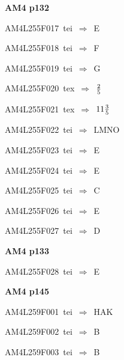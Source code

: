 \par\vfill\eject
{\bf\hfill AM4 p132\hfill\hbox{}}\par\bigskip
{\sixrm AM4L255F017\ {\sixit tei}\ }$\Rightarrow$\ E\par\smallskip
{\sixrm AM4L255F018\ {\sixit tei}\ }$\Rightarrow$\ F\par\smallskip
{\sixrm AM4L255F019\ {\sixit tei}\ }$\Rightarrow$\ G\par\smallskip
{\sixrm AM4L255F020\ {\sixit tex}\ }$\Rightarrow$\ ${2\over 5}$\par\smallskip
{\sixrm AM4L255F021\ {\sixit tex}\ }$\Rightarrow$\ $11 {3\over 5}$\par\smallskip
{\sixrm AM4L255F022\ {\sixit tei}\ }$\Rightarrow$\ LMNO\par\smallskip
{\sixrm AM4L255F023\ {\sixit tei}\ }$\Rightarrow$\ E\par\smallskip
{\sixrm AM4L255F024\ {\sixit tei}\ }$\Rightarrow$\ E\par\smallskip
{\sixrm AM4L255F025\ {\sixit tei}\ }$\Rightarrow$\ C\par\smallskip
{\sixrm AM4L255F026\ {\sixit tei}\ }$\Rightarrow$\ E\par\smallskip
{\sixrm AM4L255F027\ {\sixit tei}\ }$\Rightarrow$\ D\par\smallskip

\par\vfill\eject
{\bf\hfill AM4 p133\hfill\hbox{}}\par\bigskip
{\sixrm AM4L255F028\ {\sixit tei}\ }$\Rightarrow$\ E\par\smallskip

\par\vfill\eject
{\bf\hfill AM4 p145\hfill\hbox{}}\par\bigskip
{\sixrm AM4L259F001\ {\sixit tei}\ }$\Rightarrow$\ HAK\par\smallskip
{\sixrm AM4L259F002\ {\sixit tei}\ }$\Rightarrow$\ B\par\smallskip
{\sixrm AM4L259F003\ {\sixit tei}\ }$\Rightarrow$\ B\par\smallskip

